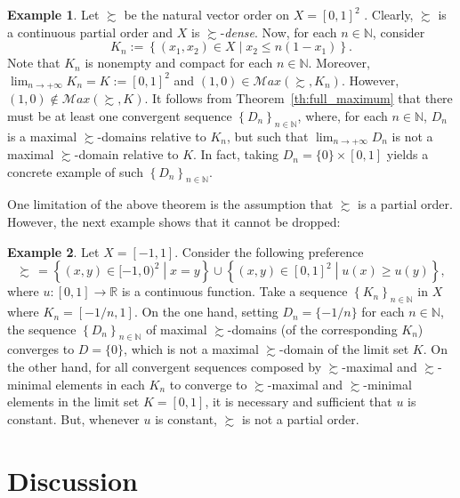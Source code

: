 \documentclass[12pt, oneside]{amsart}
\theoremstyle{definition}
\newtheorem{example}{Example}
\begin{document}
\begin{example}
Let $\succsim$ be the natural vector order on $X = [0,1]^2$ . Clearly, $\succsim$ is a continuous partial order and $X$ is $\succsim$-\textit{dense}. Now, for each $n\in \mathbb{N}$, consider
\[
K_n := \left\{(x_1, x_2) \in X \middle| x_2 \leq n(1-x_1)\right\}.
\]
Note that $K_n$ is nonempty and compact for each $n \in \mathbb{N}$. Moreover, $\lim_{n \to + \infty} K_n = K := [0,1]^2$ and $(1, 0) \in \mathcal{M}ax(\succsim, K_n)$. However, $(1,0)  \not\in \mathcal{M}ax(\succsim, K)$. It follows from Theorem~\ref{th:full_maximum} that there must be at least one convergent sequence $\left\{D_n\right\}_{n \in \mathbb{N}}$, where, for each $n \in \mathbb{N}$, $D_n$ is a maximal $\succsim$-domains relative to $K_n$, but such that $\lim_{n \to +\infty} D_n$ is not a maximal $\succsim$-domain relative to $K$. In fact, taking $D_n = \{0\} \times [0,1]$ yields a concrete example of such $\left\{D_n\right\}_{n \in \mathbb{N}}$.
\end{example}

One limitation of the above theorem is the assumption that $\succsim$ is a partial order. However, the next example shows that it cannot be dropped:

\begin{example}
\label{ex:preorder-vs-poset}
Let $X = [-1, 1]$. Consider the following preference
\[
\succsim \hspace{2pt} = \left\{(x,y) \in [-1,0)^2 \middle| x=y\right\} \cup \left\{(x, y) \in [0,1]^2 \middle| u(x) \geq u(y)\right\},
\]
where $u : [0,1] \to \mathbb{R}$ is a continuous function. Take a sequence $\left\{K_n\right\}_{n \in \mathbb{N}}$ in $X$ where $K_n = [-1/n, 1]$. On the one hand, setting $D_n = \{-1/n\}$ for each $n \in \mathbb{N}$, the sequence $\left\{D_n\right\}_{n \in \mathbb{N}}$ of maximal $\succsim$-domains (of the corresponding $K_n$) converges to $D = \{0\}$, which is not a maximal $\succsim$-domain of the limit set $K$. On the other hand, for all convergent sequences composed by $\succsim$-maximal and $\succsim$-minimal elements in each $K_n$ to converge to $\succsim$-maximal and $\succsim$-minimal elements in the limit set $K = [0, 1]$, it is necessary and sufficient that $u$ is constant. But, whenever $u$ is constant, $\succsim$ is not a partial order.
\end{example}






\section{Discussion}
\end{document}
